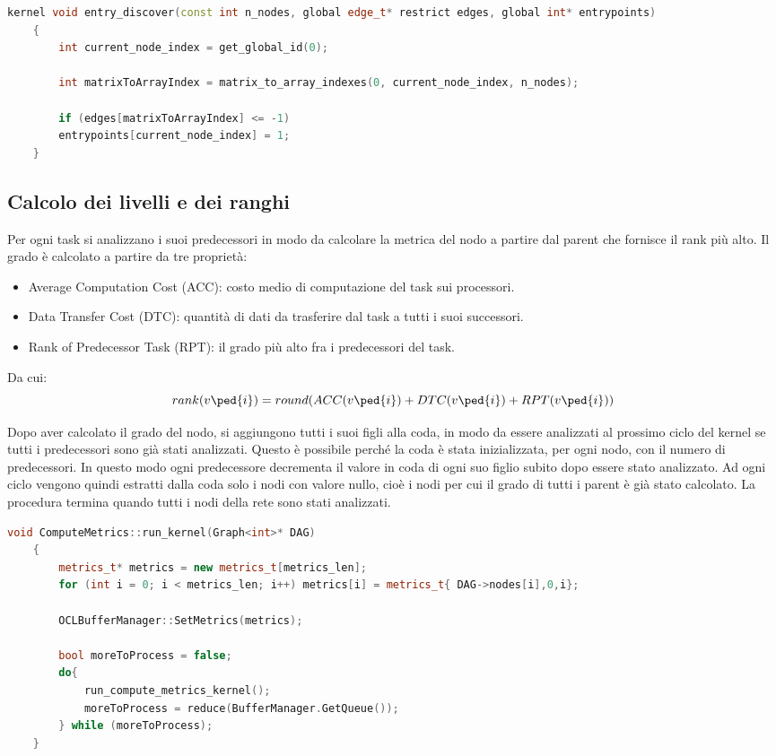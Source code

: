 \begin{lstlisting}[language=C++, caption={entry\_discover kernel},captionpos=b]
	kernel void entry_discover(const int n_nodes, global edge_t* restrict edges, global int* entrypoints)
	{
		int current_node_index = get_global_id(0);
		
		int matrixToArrayIndex = matrix_to_array_indexes(0, current_node_index, n_nodes);
		
		if (edges[matrixToArrayIndex] <= -1)
		entrypoints[current_node_index] = 1;
	}
\end{lstlisting}

\subsection{Calcolo dei livelli e dei ranghi}
Per ogni task si analizzano i suoi predecessori in modo da calcolare la metrica del nodo a partire dal parent che fornisce il rank più alto.
Il grado è calcolato a partire da tre proprietà:
\begin{itemize}
	\item Average Computation Cost (ACC): costo medio di computazione del task sui processori.
	\item Data Transfer Cost (DTC): quantità di dati da trasferire dal task a tutti i suoi successori.
	\item Rank of Predecessor Task (RPT): il grado più alto fra i predecessori del task.
\end{itemize}
Da cui:
\begin{equation}\label{Grado}
	rank(v\ped{i}) = round(ACC(v\ped{i}) + DTC(v\ped{i}) + RPT(v\ped{i}))
\end{equation}

Dopo aver calcolato il grado del nodo, si aggiungono tutti i suoi figli alla coda, in modo da essere analizzati al prossimo ciclo del kernel se tutti i predecessori sono già stati analizzati. Questo è possibile perché la coda è stata inizializzata, per ogni nodo, con il numero di predecessori. In questo modo ogni predecessore decrementa il valore in coda di ogni suo figlio subito dopo essere stato analizzato. Ad ogni ciclo vengono quindi estratti dalla coda solo i nodi con valore nullo, cioè i nodi per cui il grado di tutti i parent è già stato calcolato. La procedura termina quando tutti i nodi della rete sono stati analizzati.\\

\begin{lstlisting}[language=C++, caption={Codice host per il kernel compute\_metrics },captionpos=b]
	void ComputeMetrics::run_kernel(Graph<int>* DAG)
	{
		metrics_t* metrics = new metrics_t[metrics_len]; 
		for (int i = 0; i < metrics_len; i++) metrics[i] = metrics_t{ DAG->nodes[i],0,i};
		
		OCLBufferManager::SetMetrics(metrics);
		
		bool moreToProcess = false;
		do{
			run_compute_metrics_kernel();
			moreToProcess = reduce(BufferManager.GetQueue());
		} while (moreToProcess);
	}
\end{lstlisting}

